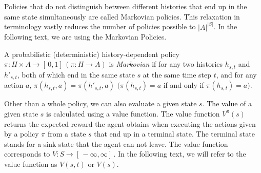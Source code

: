 Policies that do not distinguish between different histories that end up in the same state simultaneously are called Markovian policies. This relaxation in terminology vastly reduces the number of policies possible to $|A|^{|S|}$. In the following text, we are using the Markovian Policies.






\begin{definition}
A probabilistic (deterministic) history-dependent policy $\pi: H \times A \rightarrow [ \,0, 1] \,(\pi: H \rightarrow A)$ is \textit{Markovian} if for any two histories $h_{s,t}$ and $h'_{s,t}$, both of which end in the same state $s$ at the same time step $t$, and for any action $a$, 
$\pi(h_{s,t}, a) = \pi(h'_{s,t}, a)$ $(\pi(h_{s,t}) = a$ if and only if $\pi(h_{s,t}) = a)$.
\end{definition}

Other than a whole policy, we can also evaluate a given state $s$. The value of a given state $s$ is calculated using a value function. The value function $V^{\pi}(s)$ returns the expected reward the agent obtains when executing the actions given by a policy $\pi$ from a state $s$ that end up in a terminal state. The terminal state stands for a sink state that the agent can not leave. The value function corresponds to $V: S \rightarrow [ \,-\infty, \infty] \,$. In the following text, we will refer to the value function as $V(s, t)$ or $V(s)$.


